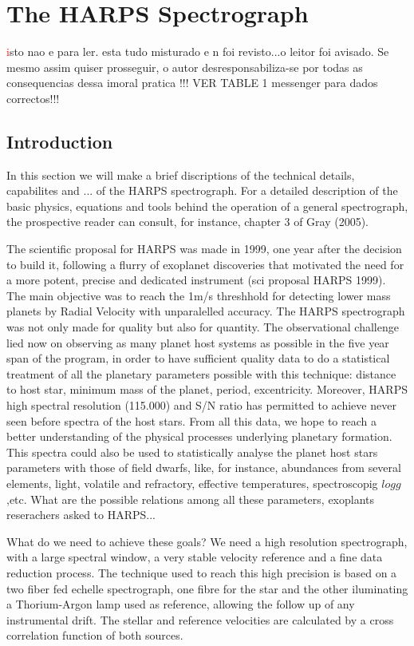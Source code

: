 \documentclass[dvips,12pt,a4paper]{report}
\begin{document}
{{\appendix

\chapter {The HARPS Spectrograph}
\textcolor{red} isto nao e para ler. esta tudo misturado e n foi revisto...o leitor foi avisado. Se mesmo assim quiser prosseguir, o autor desresponsabiliza-se por todas as consequencias dessa imoral pratica !!!
VER TABLE 1 messenger para dados correctos!!!
\section {Introduction}

In this section we will make a brief discriptions of the technical details, capabilites and ...  of the HARPS spectrograph. For a detailed description of the basic physics, equations and tools behind the operation of a general spectrograph, the prospective reader can consult, for instance, chapter 3 of Gray (2005).

The scientific proposal for HARPS was made in 1999, one year after the decision to build it, following a flurry of exoplanet discoveries that motivated the need for a more potent, precise and dedicated instrument (sci proposal HARPS 1999). The main objective was to reach the 1m/s threshhold for detecting lower mass planets by Radial Velocity with unparalelled accuracy. The HARPS spectrograph was not only made for quality but also for quantity. The observational challenge lied now on observing as many planet host systems as possible in the five year span of the program, in order to have sufficient quality data to do a statistical treatment of all the planetary parameters possible with this technique: distance to host star, minimum mass of the planet, period, excentricity. Moreover, HARPS high spectral resolution (115.000) and S/N ratio has permitted to achieve never seen before spectra of the host stars. From all this data, we hope to reach a better understanding of the physical processes underlying planetary formation. This spectra could also be used to statistically analyse the planet host stars parameters with those of field dwarfs, like, for instance, abundances from several elements, light, volatile and refractory, effective temperatures, spectroscopig $log g$,etc. What are the possible relations among all these parameters, exoplants reserachers asked to HARPS... 

What do we need to achieve these goals? We need a high resolution spectrograph, with a large spectral window, a very stable velocity reference and a fine data reduction process. The technique used to reach this high precision is based on a two fiber fed echelle spectrograph, one fibre for the star and the other iluminating a Thorium-Argon lamp used as reference, allowing the follow up of any instrumental drift. The stellar and reference velocities are calculated by a cross correlation function of both sources. 

}}
\end{document}
